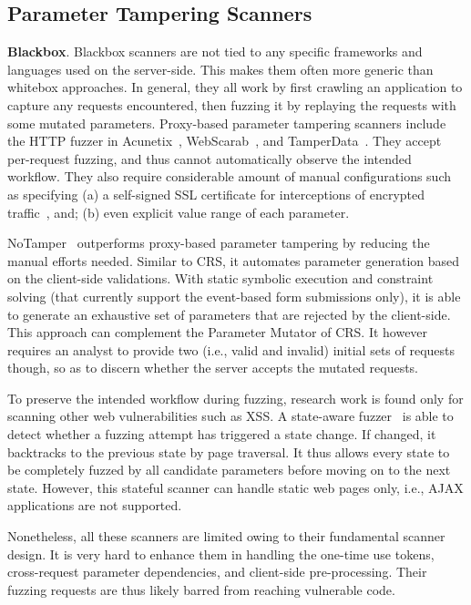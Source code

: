 \documentclass[letter]{sig-alternate-2013}
\begin{document}
\subsection{Parameter Tampering Scanners} 
\textbf{Blackbox}. Blackbox scanners are not tied to any specific frameworks and languages used on the server-side. This makes them often more generic than whitebox approaches. In general, they all work by first crawling an application to capture any requests encountered, then fuzzing it by replaying the requests with some mutated parameters. 
Proxy-based parameter tampering scanners include the HTTP fuzzer in Acunetix~\cite{acunetix}, WebScarab~\cite{webscarab}, and TamperData~\cite{tamperdata}. They accept per-request fuzzing, and thus cannot automatically observe the intended workflow. They also require considerable amount of manual configurations such as specifying (a) a self-signed SSL certificate for interceptions of encrypted traffic~\cite{sslock}, and; (b) even explicit value range of each parameter.
 
NoTamper~\cite{notamper} outperforms proxy-based parameter tampering by reducing the manual efforts needed. Similar to CRS, it automates parameter generation based on the client-side validations. With static symbolic execution and constraint solving (that currently support the event-based form submissions only), it is able to generate an exhaustive set of parameters that are rejected by the client-side. This approach can complement the Parameter Mutator of CRS. It however requires an analyst to provide two (i.e., valid and invalid) initial sets of requests though, so as to discern whether the server accepts the mutated requests.

To preserve the intended workflow during fuzzing, research work is found only for scanning other web vulnerabilities such as XSS. A state-aware fuzzer~\cite{state-aware} is able to detect whether a fuzzing attempt has triggered a state change. If changed, it backtracks to the previous state by page traversal. It thus allows every state to be completely fuzzed by all candidate parameters before moving on to the next state. However, this stateful scanner can handle static web pages only, i.e., AJAX applications are not supported.

Nonetheless, all these scanners are limited owing to their fundamental scanner design. It is very hard to enhance them in handling the one-time use tokens, cross-request parameter dependencies, and client-side pre-processing. Their fuzzing requests are thus likely barred from reaching vulnerable code.
\end{document}
